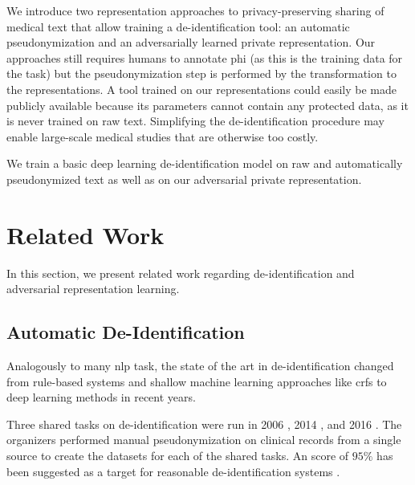 %
We introduce two representation approaches to privacy-preserving sharing of medical text that allow training a de-identification tool: an automatic pseudonymization and an adversarially learned private representation.
%
Our approaches still requires humans to annotate \ac{phi} (as this is the training data for the task) but the pseudonymization step is performed by the transformation to the representations.
%
A tool trained on our representations could easily be made publicly available because its parameters cannot contain any protected data, as it is never trained on raw text.
%
Simplifying the de-identification procedure may enable large-scale medical studies that are otherwise too costly.

We train a basic deep learning de-identification model on raw and automatically pseudonymized text as well as on our adversarial private representation.
%

\section{Related Work}\label{sec:related}
%
In this section, we present related work regarding de-identification and adversarial representation learning.

\subsection{Automatic De-Identification}
%
Analogously to many \ac{nlp} task, the state of the art in de-identification changed from rule-based systems and shallow machine learning approaches like \acp{crf} \citep{uzuner2007evaluating,meystre2010automatic} to deep learning methods \citep{stubbs2017identification, dernoncourt2017identification, liu2017identification} in recent years.

%
Three shared tasks on de-identification were run in 2006 \citep{uzuner2007evaluating}, 2014 \citep{stubbs2015annotating, stubbs2015automated}, and 2016 \citep{stubbs2017identification}.
%
The organizers performed manual pseudonymization on clinical records from a single source to create the datasets for each of the shared tasks.
%
An \fone score of $95\%$ has been suggested as a target for reasonable de-identification systems \citep{stubbs2015automated}.

